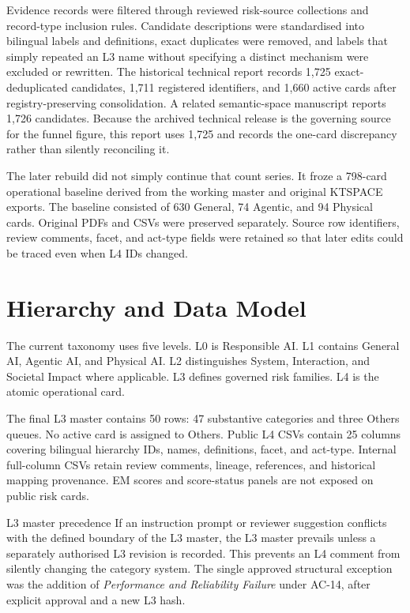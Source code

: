 \documentclass[10pt,a4paper]{article}
\begin{document}
Evidence records were filtered through reviewed risk-source collections and record-type inclusion rules. Candidate descriptions were standardised into bilingual labels and definitions, exact duplicates were removed, and labels that simply repeated an L3 name without specifying a distinct mechanism were excluded or rewritten. The historical technical report records 1,725 exact-deduplicated candidates, 1,711 registered identifiers, and 1,660 active cards after registry-preserving consolidation. A related semantic-space manuscript reports 1,726 candidates. Because the archived technical release is the governing source for the funnel figure, this report uses 1,725 and records the one-card discrepancy rather than silently reconciling it.

The later rebuild did not simply continue that count series. It froze a 798-card operational baseline derived from the working master and original KTSPACE exports. The baseline consisted of 630 General, 74 Agentic, and 94 Physical cards. Original PDFs and CSVs were preserved separately. Source row identifiers, review comments, facet, and act-type fields were retained so that later edits could be traced even when L4 IDs changed.

\section{Hierarchy and Data Model}

The current taxonomy uses five levels. L0 is Responsible AI. L1 contains General AI, Agentic AI, and Physical AI. L2 distinguishes System, Interaction, and Societal Impact where applicable. L3 defines governed risk families. L4 is the atomic operational card.

The final L3 master contains 50 rows: 47 substantive categories and three Others queues. No active card is assigned to Others. Public L4 CSVs contain 25 columns covering bilingual hierarchy IDs, names, definitions, facet, and act-type. Internal full-column CSVs retain review comments, lineage, references, and historical mapping provenance. EM scores and score-status panels are not exposed on public risk cards.

\begin{decisionbox}{L3 master precedence}
If an instruction prompt or reviewer suggestion conflicts with the defined boundary of the L3 master, the L3 master prevails unless a separately authorised L3 revision is recorded. This prevents an L4 comment from silently changing the category system. The single approved structural exception was the addition of \emph{Performance and Reliability Failure} under AC-14, after explicit approval and a new L3 hash.
\end{decisionbox}
\end{document}
